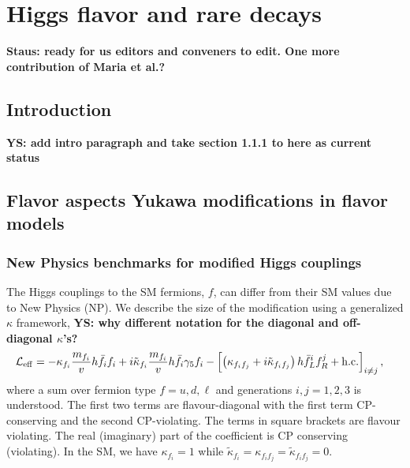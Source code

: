\documentclass[../report.tex]{subfiles}
\begin{document}
\section{Higgs flavor and rare decays}


{\bf{Staus: ready for us editors and conveners to edit. One more contribution of Maria et al.?}}

\subsection{Introduction}

{\bf YS: add intro paragraph and take section 1.1.1 to here as current status}


\subsection{Flavor aspects Yukawa modifications in flavor models}

\subsubsection{New Physics benchmarks for modified Higgs couplings}

The Higgs couplings to the SM fermions, $f$, can differ from their SM
values due to New Physics (NP). We describe the size of the modification using a
generalized $\kappa$ framework,
{\bf YS: why different notation for the diagonal and off-diagonal $\kappa$'s?}
\begin{equation}\label{eq:L_eff}
\begin{split}
	\mathcal{L}_{\rm eff} &= -\kappa_{f_i} \frac{m_{f_i}}{v} h \bar f_i f_i + i \tilde \kappa_{f_i} \frac{m_{f_i}}{v} h \bar f_i \gamma_5 f_i  
	- \left[\left( \kappa_{f_i f_j} + i \tilde \kappa_{f_i f_j} \right) h \bar f_L^i f_R^j +{\rm h.c.}\right]_{i\neq j}, 
\end{split}
\end{equation}
where a sum over fermion type $f=u,d,\ell$ and generations $i,j=1,2,3$ is understood.
The first two terms are flavour-diagonal with the first term CP-conserving and
the second CP-violating.  The terms in square brackets are flavour
violating. The real (imaginary) part of the coefficient is CP
conserving (violating). In the SM, we have $\kappa_{f_i}=1$ while $\tilde
\kappa_{f_i}=\kappa_{{f_i}{f_j}}=\tilde \kappa_{{f_i}{f_j}}=0$.
\end{document}
